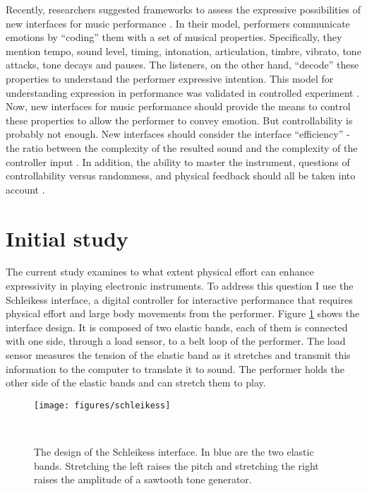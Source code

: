 \documentclass{sigchi}
\begin{document}
Recently, researchers suggested frameworks to assess the expressive possibilities of new interfaces for music performance \cite{Poepel2005}.
In their model, performers communicate emotions by ``coding'' them with a set of musical properties.
Specifically, they mention tempo, sound level, timing, intonation, articulation, timbre, vibrato, tone attacks, tone decays and pauses.
The listeners, on the other hand, ``decode'' these properties to understand the performer expressive intention.
This model for understanding expression in performance was validated in controlled experiment \cite{Gabrielsson1996}.
Now, new interfaces for music performance should provide the means to control these properties to allow the performer to convey emotion.
But controllability is probably not enough.
New interfaces should consider the interface ``efficiency'' - the ratio between the complexity of the resulted sound and the complexity of the controller input \cite{Jorda2004}.
In addition, the ability to master the instrument, questions of controllability versus randomness, and physical feedback should all be taken into account \cite{Dobrian2006}.

\section{Initial study}

The current study examines to what extent physical effort can enhance expressivity in playing electronic instruments.
To address this question I use the Schleikess interface, a digital controller for interactive performance that requires physical effort and large body movements from the performer.
Figure \ref{fig:schleikess} shows the interface design.
It is composed of two elastic bands, each of them is connected with one side, through a load sensor, to a belt loop of the performer.
The load sensor measures the tension of the elastic band as it stretches and transmit this information to the computer to translate it to sound.
The performer holds the other side of the elastic bands and can stretch them to play.

\begin{figure}
  \centering
  \texttt{[image: figures/schleikess]}
  \caption{The design of the Schleikess interface. In blue are the two elastic bands. Stretching the left raises the pitch and stretching the right raises the amplitude of a sawtooth tone generator.}~\label{fig:schleikess}
\end{figure}
\end{document}
